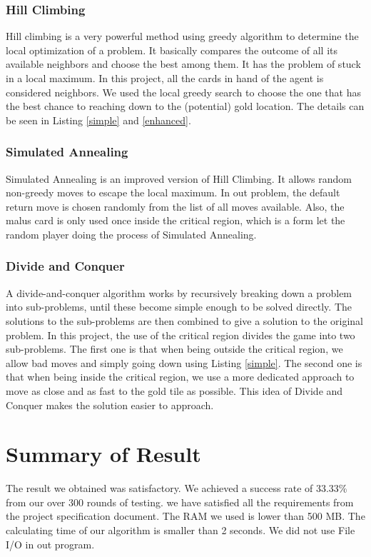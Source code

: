 \documentclass[12pt,twoside,letterpaper]{article}
\begin{document}
\subsubsection{Hill Climbing}
 Hill climbing is a very powerful method using greedy algorithm to determine the local optimization of a problem. It basically compares the outcome of all its available neighbors and choose the best among them. It has the problem of stuck in a local maximum. In this project, all the cards in hand of the agent is considered neighbors. We used the local greedy search to choose the one that has the best chance to reaching down to the (potential) gold location. The details can be seen in Listing \ref{simple} and \ref{enhanced}.
\subsubsection{Simulated Annealing}
Simulated Annealing is an improved version of Hill Climbing. It allows random non-greedy moves to escape the local maximum. In out problem, the default return move is chosen randomly from the list of all moves available. Also, the malus card is only used once inside the critical region, which is a form let the random player doing the process of Simulated Annealing.
\subsubsection{Divide and Conquer}
A divide-and-conquer algorithm works by recursively breaking down a problem into sub-problems, until these become simple enough to be solved directly. The solutions to the sub-problems are then combined to give a solution to the original problem. In this project, the use of the critical region divides the game into two sub-problems. The first one is that when being outside the critical region, we allow bad moves and simply going down using Listing \ref{simple}. The second one is that when being inside the critical region, we use a more dedicated approach to move as close and as fast to the gold tile as possible. This idea of Divide and Conquer makes the solution easier to approach.

\section{Summary of Result}
The result we obtained was satisfactory. We achieved a success rate of 33.33\% from our over 300 rounds of testing. we have satisfied all the requirements from the project specification document. The RAM we used is lower than 500 MB. The calculating time of our algorithm is smaller than 2 seconds. We did not use File I/O in out program.
\end{document}
